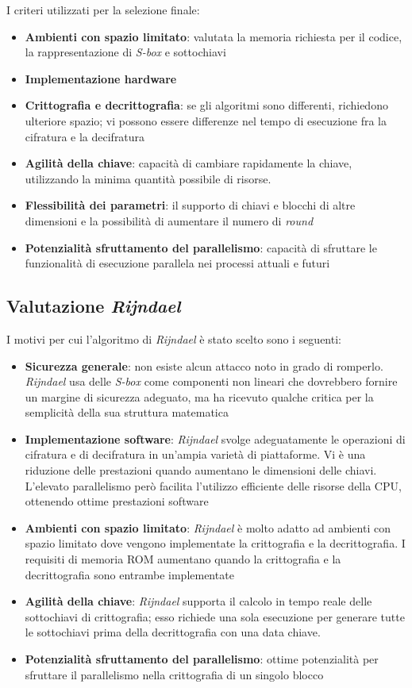 \documentclass[a4paper,11pt]{article}
\begin{document}
I criteri utilizzati per la selezione finale:
\begin{itemize}
    \item \textbf{Ambienti con spazio limitato}: valutata la memoria richiesta per il codice, la rappresentazione di \textit{S-box} e sottochiavi
    \item \textbf{Implementazione hardware}
    \item \textbf{Crittografia e decrittografia}: se gli algoritmi sono differenti, richiedono ulteriore spazio; vi possono essere differenze nel tempo di esecuzione fra la cifratura e la decifratura
    \item \textbf{Agilità della chiave}: capacità di cambiare rapidamente la chiave, utilizzando la minima quantità possibile di risorse.
    \item \textbf{Flessibilità dei parametri}: il supporto di chiavi e blocchi di altre dimensioni e la possibilità di aumentare il numero di \textit{round}
    \item \textbf{Potenzialità sfruttamento del parallelismo}: capacità di sfruttare le funzionalità di esecuzione parallela nei processi attuali e futuri 
\end{itemize}

\subsection{Valutazione \textit{Rijndael}}
I motivi per cui l'algoritmo di \textit{Rijndael} è stato scelto sono i seguenti:
\begin{itemize}
    \item \textbf{Sicurezza generale}: non esiste alcun attacco noto in grado di romperlo. \textit{Rijndael} usa delle \textit{S-box} come componenti non lineari che dovrebbero fornire un margine di sicurezza adeguato, ma ha ricevuto qualche critica per la semplicità della sua struttura matematica
    \item \textbf{Implementazione software}: \textit{Rijndael} svolge adeguatamente le operazioni di cifratura e di decifratura in un'ampia varietà di piattaforme. Vi è una riduzione delle prestazioni quando aumentano le dimensioni delle chiavi. L'elevato parallelismo però facilita l'utilizzo efficiente delle risorse della CPU, ottenendo ottime prestazioni software
    \item \textbf{Ambienti con spazio limitato}: \textit{Rijndael} è molto adatto ad ambienti con spazio limitato dove vengono implementate la crittografia e la decrittografia. I requisiti di memoria ROM aumentano quando la crittografia e la decrittografia sono entrambe implementate
    \item \textbf{Agilità della chiave}: \textit{Rijndael} supporta il calcolo in tempo reale delle sottochiavi di crittografia; esso richiede una sola esecuzione per generare tutte le sottochiavi prima della decrittografia con una data chiave. 
    \item \textbf{Potenzialità sfruttamento del parallelismo}: ottime potenzialità per sfruttare il parallelismo nella crittografia di un singolo blocco
\end{itemize}
\end{document}

